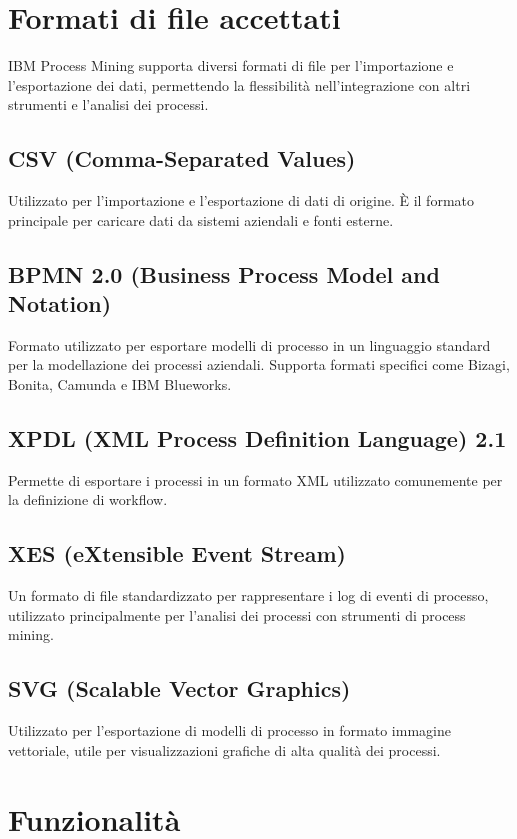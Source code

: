 \documentclass{article}
\begin{document}
\section{Formati di file accettati}
IBM Process Mining supporta diversi formati di file per l'importazione e l'esportazione dei dati, permettendo la flessibilità nell'integrazione con altri strumenti e l'analisi dei processi.

\subsection{CSV (Comma-Separated Values)}
Utilizzato per l'importazione e l'esportazione di dati di origine. È il formato principale per caricare dati da sistemi aziendali e fonti esterne.

\subsection{BPMN 2.0 (Business Process Model and Notation)}
Formato utilizzato per esportare modelli di processo in un linguaggio standard per la modellazione dei processi aziendali. Supporta formati specifici come Bizagi, Bonita, Camunda e IBM Blueworks.

\subsection{XPDL (XML Process Definition Language) 2.1}
Permette di esportare i processi in un formato XML utilizzato comunemente per la definizione di workflow.

\subsection{XES (eXtensible Event Stream)}
Un formato di file standardizzato per rappresentare i log di eventi di processo, utilizzato principalmente per l'analisi dei processi con strumenti di process mining.

\subsection{SVG (Scalable Vector Graphics)}
Utilizzato per l'esportazione di modelli di processo in formato immagine vettoriale, utile per visualizzazioni grafiche di alta qualità dei processi.

\section{Funzionalità}
\end{document}
